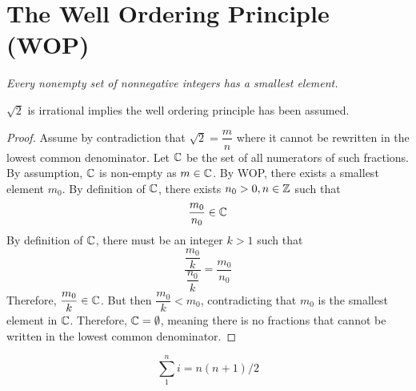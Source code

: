 \chapter{The Well Ordering Principle (WOP)}

\begin{center}
    \emph{Every nonempty set of nonnegative integers has a smallest element.}
\end{center}

\begin{claim}
    $\sqrt{2}$ is irrational implies the well ordering principle has been assumed.
\end{claim}

\begin{proof}
    Assume by contradiction that $\sqrt{2} = \dfrac{m}{n}$ where it cannot be rewritten
    in the lowest common denominator. Let $\mathbb{C}$ be the set of all numerators of such fractions.
    By assumption, $\mathbb{C}$ is non-empty as $m \in \mathbb{C}$. By WOP, there exists a smallest element
    $m_{0}$. By definition of $\mathbb{C}$, there exists $n_{0} > 0, n \in \mathbb{Z}$ such that
    \begin{equation*}
        \dfrac{m_0}{n_0} \in \mathbb{C}
    \end{equation*}
    By definition of $\mathbb{C}$, there must be an integer $k > 1$ such that
    \begin{equation*}
        \dfrac{\dfrac{m_0}{k}}{\dfrac{n_0}{k}} = \dfrac{m_0}{n_0}
    \end{equation*}
    Therefore, $\dfrac{m_0}{k} \in \mathbb{C}$. But then $\dfrac{m_0}{k} < m_0$, contradicting
    that $m_0$ is the smallest element in $\mathbb{C}$. Therefore, $\mathbb{C} = \emptyset$, meaning
    there is no fractions that cannot be written in the lowest common denominator.
\end{proof}

\begin{claim}
    \begin{equation}
        \sum_{1}^{n} i = n(n+1)/2
    \end{equation}
\end{claim}
